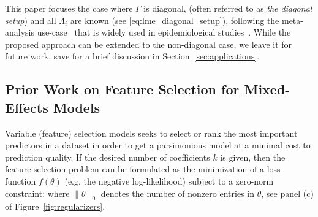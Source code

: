 %
%
%
%
% 
%


This paper focuses the case where $\Gamma$ is diagonal, 
  (often referred to as \textit{the diagonal setup}) 
 and all $\Lambda_i$ are known (see \eqref{eq:lme_diagonal_setup}), 
following the meta-analysis use-case~\citep{zheng2021trimmed} that is widely used in epidemiological studies~\cite{murray2020global}. 
While the proposed approach can be extended to the non-diagonal case, we leave it for future work, save for a brief discussion in Section~\ref{sec:applications}.

\subsection{Prior Work on Feature Selection for Mixed-Effects Models}
\label{sec:prior_work}

Variable (feature) selection models seeks to select or rank the most important predictors in a dataset in order to get a parsimonious model at a minimal cost to prediction quality. 
If the desired number of coefficients $k$ is given, then the feature selection problem can be formulated as the minimization of a loss function $f(\theta)$ (e.g. the negative log-likelihood) subject to a zero-norm constraint:
where $\|\theta\|_0$ denotes the number of nonzero entries in $\theta$, see panel (c) of Figure~\ref{fig:regularizers}.

